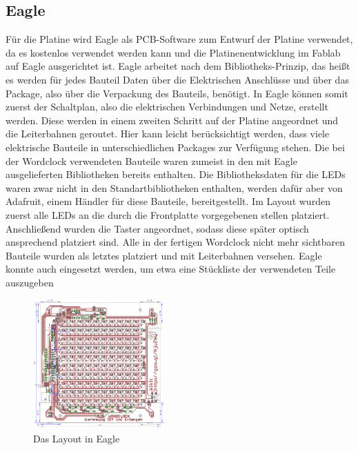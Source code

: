 \documentclass[12pt,journal,compsoc]{IEEEtran}
\begin{document}
\subsection{Eagle}
Für die Platine wird Eagle als PCB-Software zum Entwurf der Platine verwendet, da es kostenlos verwendet werden kann und die Platinenentwicklung im Fablab auf Eagle ausgerichtet ist. Eagle arbeitet nach dem Bibliotheks-Prinzip, das heißt es werden für jedes  Bauteil Daten über die Elektrischen Anschlüsse und über das Package, also über die Verpackung des Bauteils, benötigt. In Eagle können somit  zuerst der Schaltplan, also die elektrischen Verbindungen und Netze, erstellt werden. Diese werden in einem zweiten Schritt auf der Platine angeordnet und die Leiterbahnen geroutet. Hier kann leicht berücksichtigt werden, dass viele elektrische Bauteile in unterschiedlichen Packages zur Verfügung stehen. Die bei der Wordclock verwendeten Bauteile waren zumeist in den mit Eagle ausgelieferten Bibliotheken bereits enthalten. Die Bibliotheksdaten für die LEDs waren zwar nicht in den Standartbibliotheken enthalten, werden dafür aber von Adafruit, einem Händler für diese Bauteile, bereitgestellt. Im Layout wurden zuerst alle LEDs an die durch die Frontplatte vorgegebenen stellen platziert. Anschließend wurden die Taster angeordnet, sodass diese später optisch ansprechend platziert sind. Alle in der fertigen Wordclock nicht mehr sichtbaren Bauteile wurden als letztes platziert und mit Leiterbahnen versehen. Eagle konnte auch eingesetzt werden, um etwa eine Stückliste der verwendeten Teile auszugeben
\begin{figure}
	\centering
	\includegraphics[width=0.45\textwidth]{Bilder/Eagle.png}
	\caption{Das Layout in Eagle} 
	\label{fig:EagleL}
\end{figure}
\end{document}

